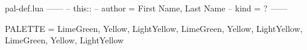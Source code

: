 
%
%
%
%

\begin{filecontents*}[overwrite]{pal-def.lua}
------
-- this::
--     author = First Name, Last Name
--     kind   = ?
------

PALETTE = {
  LimeGreen,
  Yellow,
  LightYellow,
  LimeGreen,
  Yellow,
  LightYellow,
  LimeGreen,
  Yellow,
  LightYellow
}
\end{filecontents*}



\documentclass{tutodoc}

\geometry{
  landscape,
  twocolumn,
  top  = .75cm, bottom = .75cm,
  left = .75cm, right  = .75cm
}

\usepackage[dvipsnames, svgnames, x11names]{xcolor}
\usepackage[3d]{luadraw}








\section*{Your palette definition}



\section*{Use cases}

\begin{luacode*}
PALSIZE = #PALETTE

PALDIM   = 1
PALDELTA = .3

xmin, xmax = -100, 100

COL_1 = "black!80"
COL_2 = "lightgray!25!white"
\end{luacode*}




